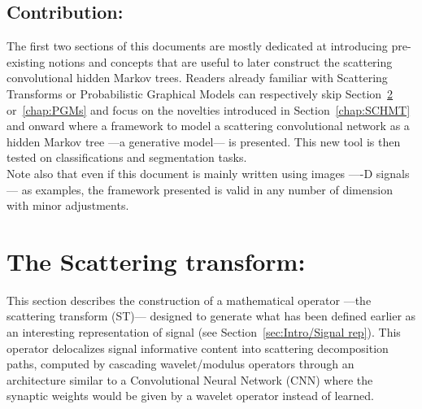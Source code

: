 \documentclass[a4paper,11pt]{report}
\begin{document}
	\section{Contribution:}
    \label{sec:Intro/Contrib}    
    
    The first two sections of this documents are mostly dedicated at introducing pre-existing notions and concepts that are useful to later construct the scattering convolutional hidden Markov trees. Readers already familiar with Scattering Transforms or Probabilistic Graphical Models can respectively skip Section~\ref{chap:ST} or~\ref{chap:PGMs} and focus on the novelties introduced in Section~\ref{chap:SCHMT} and onward where a framework to model a scattering convolutional network as a hidden Markov tree ---\ie a generative model--- is presented. This new tool is then tested on classifications and segmentation tasks.\\
    
    Note also that even if this document is mainly written using images ----D signals--- as examples, the framework presented is valid in any number of dimension with minor adjustments.

    
\chapter{The Scattering transform:}
  \label{chap:ST}
 
	This section describes the construction of a mathematical operator ---the scattering transform (ST)--- designed to generate what has been defined earlier as an interesting representation of signal (see Section~\ref{sec:Intro/Signal rep}). This operator delocalizes signal informative content into scattering decomposition paths, computed by cascading wavelet/modulus operators through an architecture similar to a Convolutional Neural Network (CNN) where the synaptic weights would be given by a wavelet operator instead of learned.\\ 
	
\end{document}
